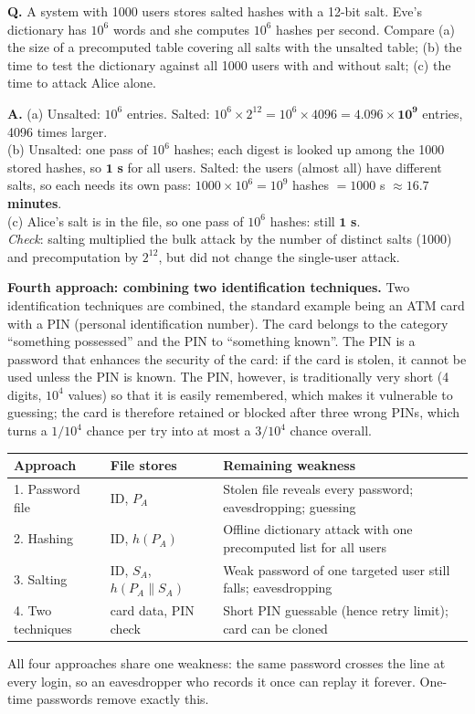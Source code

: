 \begin{worked}
\textbf{Q.} A system with 1000 users stores salted hashes with a 12-bit salt. Eve's dictionary has $10^6$ words and she computes $10^6$ hashes per second. Compare (a) the size of a precomputed table covering all salts with the unsalted table; (b) the time to test the dictionary against all 1000 users with and without salt; (c) the time to attack Alice alone.

\textbf{A.} (a) Unsalted: $10^6$ entries. Salted: $10^6 \times 2^{12} = 10^6 \times 4096 = \mathbf{4.096 \times 10^9}$ entries, 4096 times larger.\\
(b) Unsalted: one pass of $10^6$ hashes; each digest is looked up among the 1000 stored hashes, so $\mathbf{1}$ \textbf{s} for all users. Salted: the users (almost all) have different salts, so each needs its own pass: $1000 \times 10^6 = 10^9$ hashes $= 1000$ s $\approx \mathbf{16.7}$ \textbf{minutes}.\\
(c) Alice's salt is in the file, so one pass of $10^6$ hashes: still $\mathbf{1}$ \textbf{s}.\\
\emph{Check}: salting multiplied the bulk attack by the number of distinct salts (1000) and precomputation by $2^{12}$, but did not change the single-user attack.
\end{worked}

\textbf{Fourth approach: combining two identification techniques.} Two identification techniques are combined, the standard example being an ATM card with a PIN (personal identification number). The card belongs to the category ``something possessed'' and the PIN to ``something known''. The PIN is a password that enhances the security of the card: if the card is stolen, it cannot be used unless the PIN is known. The PIN, however, is traditionally very short (4 digits, $10^4$ values) so that it is easily remembered, which makes it vulnerable to guessing; the card is therefore retained or blocked after three wrong PINs, which turns a $1/10^4$ chance per try into at most a $3/10^4$ chance overall.

\begin{center}\small
\begin{tabularx}{\textwidth}{@{}l l X@{}}
\toprule
Approach & File stores & Remaining weakness\\
\midrule
1. Password file & ID, $P_A$ & Stolen file reveals every password; eavesdropping; guessing\\
2. Hashing & ID, $h(P_A)$ & Offline dictionary attack with one precomputed list for all users\\
3. Salting & ID, $S_A$, $h(P_A \| S_A)$ & Weak password of one targeted user still falls; eavesdropping\\
4. Two techniques & card data, PIN check & Short PIN guessable (hence retry limit); card can be cloned\\
\bottomrule
\end{tabularx}
\end{center}
All four approaches share one weakness: the same password crosses the line at every login, so an eavesdropper who records it once can replay it forever. One-time passwords remove exactly this.

